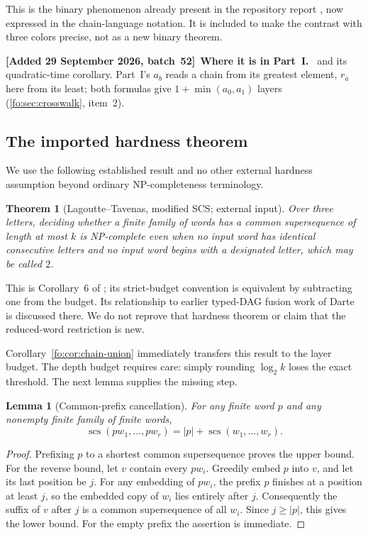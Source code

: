 \documentclass[11pt,letterpaper]{article}
\numberwithin{equation}{section}
\newtheorem{theorem}{Theorem}[section]
\newtheorem{lemma}[lemma]{Lemma}
\theoremstyle{definition}
\theoremstyle{remark}
\theoremstyle{definition}
\newcommand{\scs}{\operatorname{scs}}
\newcommand{\len}[1]{\lvert #1\rvert}
\newenvironment{writenote}[1][]{\par\smallskip\begingroup\small\sloppy
 \noindent\textbf{[Added 29 September 2026, batch~52]}\if\relax\detokenize{#1}\relax\else~\textbf{#1.}\fi\ }%
 {\par\endgroup\smallskip}
\begin{document}
This is the binary phenomenon already present in the repository report
\cite{Repo}, now expressed in the chain-language notation. It is included to
make the contrast with three colors precise, not as a new binary theorem.

\begin{writenote}[Where it is in Part~I]
 and its quadratic-time corollary. Part~I's $a_b$ reads a
chain from its greatest element, $r_a$ here from its least; both formulas give
$1+\min(a_0,a_1)$ layers (\cref{fo:sec:crosswalk}, item~2).
\end{writenote}

\subsection{The imported hardness theorem}
We use the following established result and no other external hardness
assumption beyond ordinary NP-completeness terminology.

\begin{theorem}[Lagoutte--Tavenas, modified SCS; external input]
\label{fo:thm:MSCS}
Over three letters, deciding whether a finite family of words has a common
supersequence of length at most $k$ is NP-complete even when no input word has
identical consecutive letters and no input word begins with a designated
letter, which may be called $2$.
\end{theorem}

This is Corollary~6 of \cite{LT}; its strict-budget convention is equivalent by
subtracting one from the budget. Its relationship to earlier typed-DAG fusion
work of Darte is discussed there. We do not reprove that hardness theorem or
claim that the reduced-word restriction is new.

Corollary~\ref{fo:cor:chain-union} immediately transfers this result to the layer
budget. The depth budget requires care: simply rounding $\log_2 k$ loses the
exact threshold. The next lemma supplies the missing step.

\begin{lemma}[Common-prefix cancellation]\label{fo:lem:prefix}
For any finite word $p$ and any nonempty finite family of finite words,
\begin{equation}\label{fo:eq:prefix}
 \scs(pw_1,\ldots,pw_r)=\len{p}+\scs(w_1,\ldots,w_r).
\end{equation}
\end{lemma}
\begin{proof}
Prefixing $p$ to a shortest common supersequence proves the upper bound.
For the reverse bound, let $v$ contain every $pw_i$. Greedily embed $p$ into
$v$, and let its last position be $j$. For any embedding of $pw_i$, the prefix
$p$ finishes at a position at least $j$, so the embedded copy of $w_i$ lies
entirely after $j$. Consequently the suffix of $v$ after $j$ is a common
supersequence of all $w_i$. Since $j\ge\len{p}$, this gives the lower bound.
For the empty prefix the assertion is immediate.
\end{proof}
\end{document}
